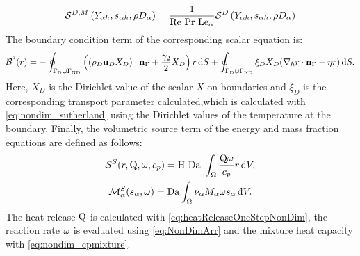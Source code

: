 \begin{equation}
\mathcal{S}^{D,M}\left(Y_{\alpha h},s_{\alpha h},\rho D_\alpha\right) = \frac{1}{\text{Re}~\text{Pr}~\text{Le}_\alpha} \mathcal{S}^D\left(Y_{\alpha h},s_{\alpha h},\rho D_\alpha\right)
\end{equation}
The boundary condition term of the corresponding scalar equation is:
\begin{equation}
	\mathcal{B}^3(r) =  -
	\oint_{\Gamma_{\text{D}}\cup \Gamma_{\text{ND}}}{ \left( (\rho_D\textbf{u}_D X_D)\cdot \textbf{n}_{\Gamma} + \frac{\gamma_2}{2}X_D\right)r \,\mathrm{d} S}
	+\oint_{\Gamma_{\text{D}}\cup \Gamma_{\text{ND}}} \xi_D X_D(\nabla_h r \cdot \textbf{n}_{\Gamma} - \eta r )\,\mathrm{d} S.
\end{equation}
Here, $X_D$ is the Dirichlet value of the scalar $X$ on boundaries and $\xi_D$ is the corresponding transport parameter calculated,which is calculated with \cref{eq:nondim_sutherland} using the Dirichlet values of the temperature at the boundary.
Finally, the volumetric source term of the energy and mass fraction equations are defined as follows:
\begin{gather}
	\mathcal{S}^S(r,\mathrm{Q}, \omega,c_p) =  \text{H}~\text{Da} ~ \int_{\Omega}{ \frac{\mathrm{Q} \omega}{c_p} r} \,\mathrm{d} V, \\
	\mathcal{M}^S_\alpha(s_\alpha,\omega ) =  \text{Da} \int_{\Omega}{  \nu_\alpha M_\alpha \omega s_\alpha} \,\mathrm{d} V.
\end{gather}
The heat release $\mathrm{Q}$ is calculated with \cref{eq:heatReleaseOneStepNonDim}, the reaction rate $\omega$ is evaluated using \cref{eq:NonDimArr} and the mixture heat capacity with \cref{eq:nondim_cpmixture}.

